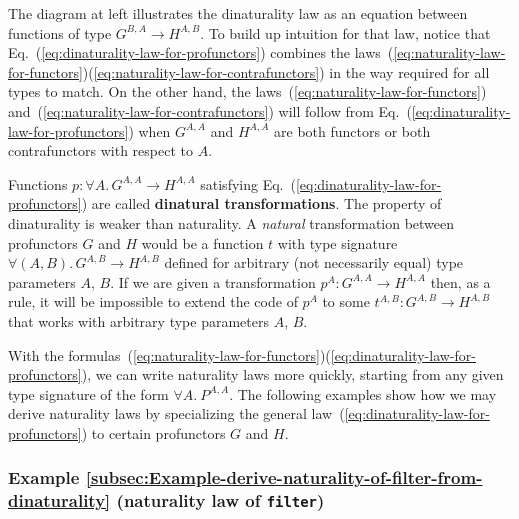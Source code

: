The diagram at left illustrates the dinaturality law as an equation
between functions of type $G^{B,A}\rightarrow H^{A,B}$. To build
up intuition for that law, notice that Eq.~(\ref{eq:dinaturality-law-for-profunctors})
combines the laws~(\ref{eq:naturality-law-for-functors})\textendash (\ref{eq:naturality-law-for-contrafunctors})
in the way required for all types to match. On the other hand, the
laws~(\ref{eq:naturality-law-for-functors}) and~(\ref{eq:naturality-law-for-contrafunctors})
will follow from Eq.~(\ref{eq:dinaturality-law-for-profunctors})
when $G^{A,A}$ and $H^{A,A}$ are both functors or both contrafunctors
with respect to $A$.

Functions $p:\forall A.\,G^{A,A}\rightarrow H^{A,A}$ satisfying Eq.~(\ref{eq:dinaturality-law-for-profunctors})
are called \textbf{dinatural transformations}.
The property of dinaturality is weaker than naturality.\emph{ }A \emph{natural}
transformation between profunctors $G$ and $H$ would be a function
$t$ with type signature $\forall(A,B).\,G^{A,B}\rightarrow H^{A,B}$
defined for arbitrary (not necessarily equal) type parameters $A$,
$B$. If we are given a transformation $p^{A}:G^{A,A}\rightarrow H^{A,A}$
then, as a rule, it will be impossible to extend the code of $p^{A}$
to some $t^{A,B}:G^{A,B}\rightarrow H^{A,B}$ that works with arbitrary
type parameters $A$, $B$.

With the formulas~(\ref{eq:naturality-law-for-functors})\textendash (\ref{eq:dinaturality-law-for-profunctors}),
we can write naturality laws more quickly, starting from any given
type signature of the form $\forall A.\:P^{A,A}$. The following examples
show how we may derive naturality laws by specializing the general
law~(\ref{eq:dinaturality-law-for-profunctors}) to certain profunctors
$G$ and $H$.

\subsubsection{Example \label{subsec:Example-derive-naturality-of-filter-from-dinaturality}\ref{subsec:Example-derive-naturality-of-filter-from-dinaturality}
(naturality law of \lstinline!filter!)}

